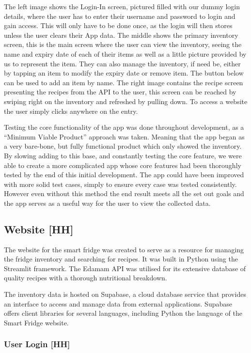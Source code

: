 The left image shows the Login-In screen, pictured filled with our dummy login details, where the user has to enter their username and password to login and gain access.
This will only have to be done once, as the login will then stores unless the user clears their App data.
The middle shows the primary inventory screen, this is the main screen where the user can view the inventory, seeing the name and expiry date of each of their items as well as a little picture provided by us to represent the item.
They can also manage the inventory, if need be, either by tapping an item to modify the expiry date or remove item.
The button below can be used to add an item by name.
The right image contains the recipe screen presenting the recipes from the API to the user, this screen can be reached by swiping right on the inventory and refreshed by pulling down.
To access a website the user simply clicks anywhere on the entry.

Testing the core functionality of the app was done throughout development, as a “Minimum Viable Product” approach was taken.
Meaning that the app began as a very bare-bone, but fully functional product which only showed the inventory.
By slowing adding to this base, and constantly testing the core feature, we were able to create a more complicated app whose core features had been thoroughly tested by the end of this initial development.
The app could have been improved with more solid test cases, simply to ensure every case was tested consistently.
However even without this method the end result meets all the set out goals and the app serves as a useful way for the user to view the collected data.

\subsection{Website [HH]}

The website  for the smart fridge was created to serve as a resource for managing the fridge inventory and searching for recipes.
It was built in Python using the Streamlit framework.
The Edamam API was utilised for its extensive database of quality recipes with a thorough nutritional breakdown.

The inventory data is hosted on Supabase, a cloud database service that provides an interface to access and manage data from external applications.
Supabase offers client libraries for several languages, including Python the language of the Smart Fridge website.

\subsubsection{User Login [HH]}

